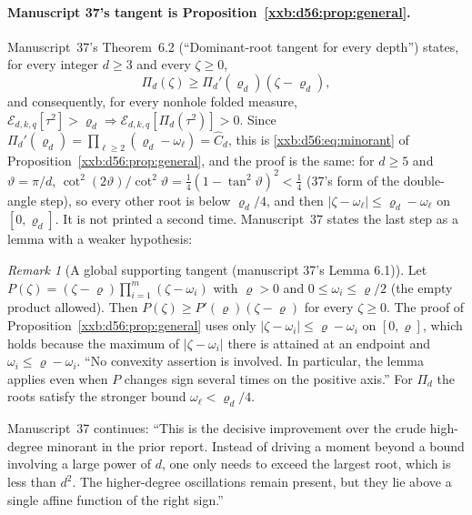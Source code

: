 \documentclass[11pt,a4paper]{article}
\numberwithin{equation}{section}
\theoremstyle{definition}
\theoremstyle{remark}
\newtheorem{remark}[theorem]{Remark}
\theoremstyle{plain}
\begin{document}
\paragraph{Manuscript 37's tangent is Proposition~\ref{xxb:d56:prop:general}.}
Manuscript~37's Theorem~6.2 (``Dominant-root tangent for every depth'') states,
for every integer $d\ge3$ and every $\zeta\ge0$,
\begin{equation}\label{xxb:d78:eq:tangent}
 \Pi_d(\zeta)\ge\Pi_d'(\varrho_d)(\zeta-\varrho_d),
\end{equation}
and consequently, for every nonhole folded measure,
$\mathcal E_{d,k,q}[\tau^2]>\varrho_d\Rightarrow\mathcal E_{d,k,q}[\Pi_d(\tau^2)]>0$.
Since $\Pi_d'(\varrho_d)=\prod_{\ell\ge2}(\varrho_d-\omega_\ell)=\widehat C_d$,
this is \eqref{xxb:d56:eq:minorant} of Proposition~\ref{xxb:d56:prop:general},
and the proof is the same: for $d\ge5$ and $\vartheta=\pi/d$,
$\cot^2(2\vartheta)/\cot^2\vartheta=\tfrac14(1-\tan^2\vartheta)^2<\tfrac14$
(37's form of the double-angle step), so every other root is below
$\varrho_d/4$, and then $|\zeta-\omega_\ell|\le\varrho_d-\omega_\ell$ on
$[0,\varrho_d]$.  It is not printed a second time.  Manuscript~37 states the
last step as a lemma with a weaker hypothesis:

\begin{remark}[A global supporting tangent (manuscript 37's Lemma 6.1)]\label{xxb:d78:rem:tangentlemma}
Let $P(\zeta)=(\zeta-\varrho)\prod_{i=1}^m(\zeta-\omega_i)$ with $\varrho>0$ and
$0\le\omega_i\le\varrho/2$ (the empty product allowed).  Then
$P(\zeta)\ge P'(\varrho)(\zeta-\varrho)$ for every $\zeta\ge0$.  The proof of
Proposition~\ref{xxb:d56:prop:general} uses only
$|\zeta-\omega_i|\le\varrho-\omega_i$ on $[0,\varrho]$, which holds because the
maximum of $|\zeta-\omega_i|$ there is attained at an endpoint and
$\omega_i\le\varrho-\omega_i$.  ``No convexity assertion is involved. In
particular, the lemma applies even when $P$ changes sign several times on the
positive axis.''  For $\Pi_d$ the roots satisfy the stronger bound
$\omega_\ell<\varrho_d/4$.
\end{remark}

Manuscript~37 continues: ``This is the decisive improvement over the crude
high-degree minorant in the prior report. Instead of driving a moment beyond a
bound involving a large power of $d$, one only needs to exceed the largest
root, which is less than $d^2$. The higher-degree oscillations remain present,
but they lie above a single affine function of the right sign.''
\end{document}
